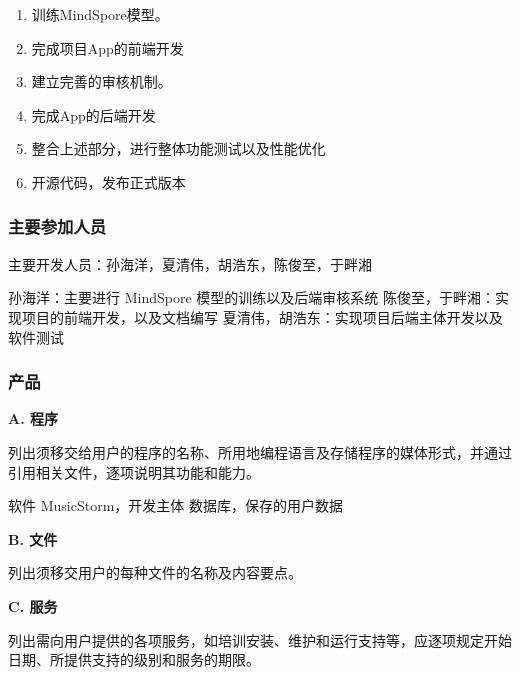 \documentclass{base}
\begin{document}
\begin{enumerate}
    \item 训练MindSpore模型。
    \item 完成项目App的前端开发
    \item 建立完善的审核机制。
    \item 完成App的后端开发
    \item 整合上述部分，进行整体功能测试以及性能优化
    \item 开源代码，发布正式版本
\end{enumerate}

\subsubsection{主要参加人员}

主要开发人员：孙海洋，夏清伟，胡浩东，陈俊至，于畔湘

孙海洋：主要进行 MindSpore 模型的训练以及后端审核系统
陈俊至，于畔湘：实现项目的前端开发，以及文档编写
夏清伟，胡浩东：实现项目后端主体开发以及软件测试

\subsubsection{产品}

\textbf{A. 程序}

列出须移交给用户的程序的名称、所用地编程语言及存储程序的媒体形式，并通过引用相关文件，逐项说明其功能和能力。

软件 MusicStorm，开发主体
数据库，保存的用户数据

\textbf{B. 文件}

列出须移交用户的每种文件的名称及内容要点。

\textbf{C. 服务}

列出需向用户提供的各项服务，如培训安装、维护和运行支持等，应逐项规定开始日期、所提供支持的级别和服务的期限。
\end{document}
